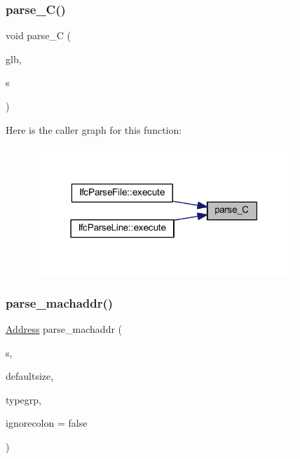 \subsubsection{\texorpdfstring{parse\_C()}{parse\_C()}}
{\footnotesize\ttfamily void parse\+\_\+C (\begin{DoxyParamCaption}\item[{\mbox{\hyperlink{class_architecture}{Architecture}} $\ast$}]{glb,  }\item[{istream \&}]{s }\end{DoxyParamCaption})}

Here is the caller graph for this function\+:
\nopagebreak
\begin{figure}[H]
\begin{center}
\leavevmode
\includegraphics[width=279pt]{grammar_8hh_a63f1cc59afe6bb193a8e271075524d7f_icgraph}
\end{center}
\end{figure}
\mbox{\label{grammar_8hh_a302ab5f0360041b5ca095c6da01fc5ea}} 
\subsubsection{\texorpdfstring{parse\_machaddr()}{parse\_machaddr()}}
{\footnotesize\ttfamily \mbox{\hyperlink{class_address}{Address}} parse\+\_\+machaddr (\begin{DoxyParamCaption}\item[{istream \&}]{s,  }\item[{int4 \&}]{defaultsize,  }\item[{const \mbox{\hyperlink{class_type_factory}{Type\+Factory}} \&}]{typegrp,  }\item[{bool}]{ignorecolon = {\ttfamily false} }\end{DoxyParamCaption})}

